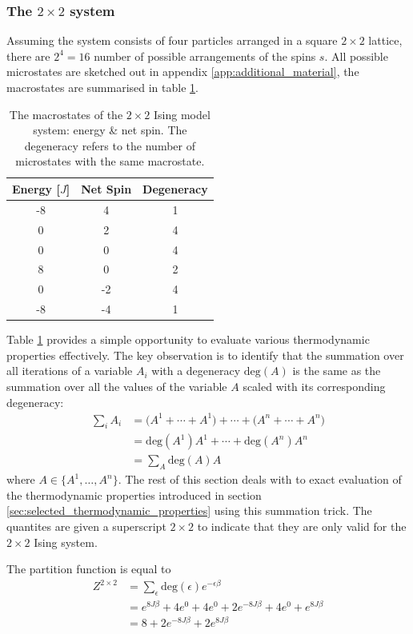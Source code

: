 \documentclass[nofootinbib,reprint,english]{revtex4-1}
\begin{document}
\subsubsection{The \(2\times2\) system}\label{sec:2by2_system}
Assuming the system consists of four particles arranged in a square \(2\times2\) lattice, there are \(2^4=16\) number of possible arrangements of the spins \(s\). All possible microstates are sketched out in appendix \ref{app:additional_material}, the macrostates are summarised in table \ref{tab:2by2_macrostates}.
\begin{table}
\begin{tabular}{|c|c|c|}
\hline
Energy [\(J\)] & Net Spin & Degeneracy \\\hline
-8 &  4 & 1 \\\hline
0  &  2 & 4 \\\hline
0  &  0 & 4 \\\hline
8  &  0 & 2 \\\hline
0  & -2 & 4 \\\hline
-8 & -4 & 1 \\\hline
\end{tabular}
\caption{The macrostates of the \(2\times2\) Ising model system: energy \& net spin. The degeneracy refers to the number of microstates with the same macrostate.}\label{tab:2by2_macrostates}
\end{table}

Table \ref{tab:2by2_macrostates} provides a simple opportunity to evaluate various thermodynamic properties effectively. The key observation is to identify that the summation over all iterations of a variable \(A_i\) with a degeneracy \(\text{deg}(A)\) is the same as the summation over all the values of the variable \(A\) scaled with its corresponding degeneracy:
\begin{align*}
\sum_iA_i&=\big(A^1+\cdots+A^1\big)+\cdots+\big(A^n+\cdots+A^n\big)\\
&=\text{deg}(A^1)A^1+\cdots+\text{deg}(A^n)A^n\\
&=\sum_A\text{deg}(A)A
\end{align*}
where \(A\in\{A^1,\ldots,A^n\}\). The rest of this section deals with to exact evaluation of the thermodynamic properties introduced in section \ref{sec:selected_thermodynamic_properties} using this summation trick. The quantites are given a superscript \(2\times2\) to indicate that they are only valid for the \(2\times2\) Ising system.

The partition function is equal to
\begin{align}
Z^{2\times2}&=\sum_\epsilon\text{deg}(\epsilon)e^{-\epsilon\beta}\nonumber\\
&=e^{8J\beta}+4e^0+4e^0+2e^{-8J\beta}+4e^0+e^{8J\beta}\nonumber\\
&=8+2e^{-8J\beta}+2e^{8J\beta}
\end{align}
\end{document}
